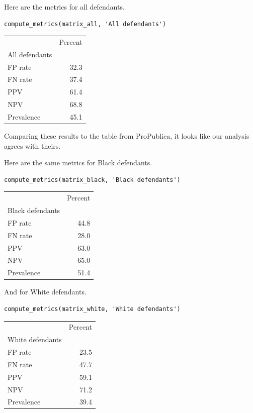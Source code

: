 Here are the metrics for all defendants.

\begin{lstlisting}[]
compute_metrics(matrix_all, 'All defendants')
\end{lstlisting}

\begin{tabular}{lr}
\midrule
{} &  Percent \\
All defendants &          \\
\midrule
FP rate        &     32.3 \\
FN rate        &     37.4 \\
PPV            &     61.4 \\
NPV            &     68.8 \\
Prevalence     &     45.1 \\
\midrule
\end{tabular}

Comparing these results to the table from ProPublica, it looks like our
analysis agrees with theirs.

Here are the same metrics for Black defendants.

\begin{lstlisting}[]
compute_metrics(matrix_black, 'Black defendants')
\end{lstlisting}

\begin{tabular}{lr}
\midrule
{} &  Percent \\
Black defendants &          \\
\midrule
FP rate          &     44.8 \\
FN rate          &     28.0 \\
PPV              &     63.0 \\
NPV              &     65.0 \\
Prevalence       &     51.4 \\
\midrule
\end{tabular}

And for White defendants.

\begin{lstlisting}[]
compute_metrics(matrix_white, 'White defendants')
\end{lstlisting}

\begin{tabular}{lr}
\midrule
{} &  Percent \\
White defendants &          \\
\midrule
FP rate          &     23.5 \\
FN rate          &     47.7 \\
PPV              &     59.1 \\
NPV              &     71.2 \\
Prevalence       &     39.4 \\
\midrule
\end{tabular}

